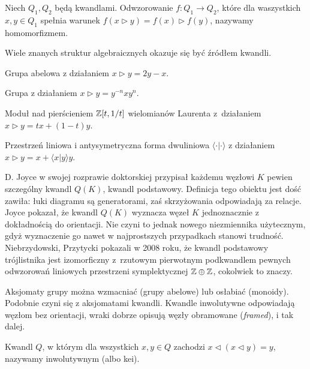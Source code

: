 \begin{definition}
    Niech $Q_1, Q_2$ będą kwandlami.
    Odwzorowanie $f \colon Q_1 \to Q_2$, które dla waszystkich $x,y \in Q_1$ spełnia warunek $f(x \triangleright y) = f(x) \triangleright f(y)$, nazywamy homomorfizmem.
\end{definition}

Wiele znanych struktur algebraicznych okazuje się być źródłem kwandli.

\begin{example}
    Grupa abelowa z działaniem $x \triangleright y = 2y - x$.
\end{example}

\begin{example}
    Grupa z działaniem $x \triangleright y = y^{-n} x y^n$.
\end{example}

\begin{example}
    Moduł nad pierścieniem $\mathbb Z[t, 1/t]$ wielomianów Laurenta z~działaniem $x \triangleright y =tx + (1-t) y$.
\end{example}

\begin{example}
    Przestrzeń liniowa i antysymetryczna forma dwuliniowa $\langle \cdot | \cdot \rangle$ z działaniem $x \triangleright y = x + \langle x | y \rangle y$.
\end{example}

D. Joyce w swojej rozprawie doktorskiej przypisał każdemu węzłowi $K$ pewien szczególny kwandl $Q(K)$, kwandl podstawowy.
Definicja tego obiektu jest dość zawiła: łuki diagramu są generatorami, zaś skrzyżowania odpowiadają za relacje.
Joyce pokazał, że kwandl $Q(K)$ wyznacza węzeł $K$ jednoznacznie z dokładnością do orientacji.
Nie czyni to jednak nowego niezmiennika użytecznym, gdyż wyznaczenie go nawet w najprostszych przypadkach stanowi trudność.
Niebrzydowski, Przytycki pokazali w 2008 roku, że kwandl podstawowy trójlistnika jest izomorficzny z~rzutowym pierwotnym podkwandlem pewnych odwzorowań liniowych przestrzeni symplektycznej $\mathbb Z \oplus \mathbb Z$, cokolwiek to znaczy.

Aksjomaty grupy można wzmacniać (grupy abelowe) lub osłabiać (monoidy).
Podobnie czyni się z aksjomatami kwandli.
Kwandle inwolutywne odpowiadają węzłom bez orientacji, wraki dobrze opisują węzły obramowane (\emph{framed}), i tak dalej.

\begin{definition}
    Kwandl $Q$, w którym dla wszystkich $x, y \in Q$ zachodzi $x \triangleleft (x \triangleleft y) = y$, nazywamy inwolutywnym (albo kei).
\end{definition}

